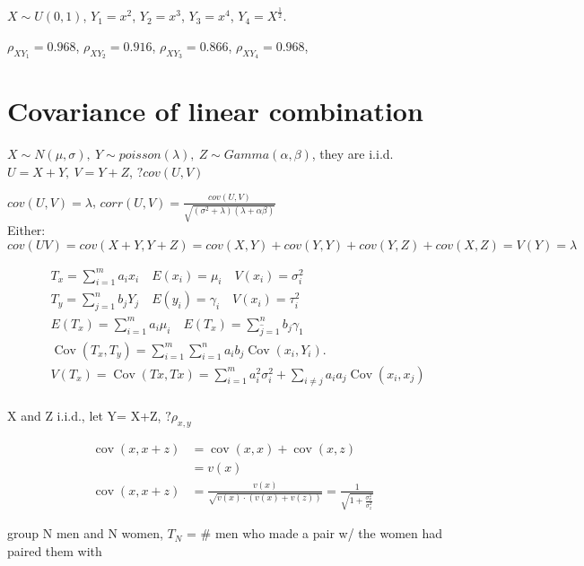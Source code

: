\documentclass{article}
\begin{document}
\begin{example}
    $X\sim U( 0,1 ) $, $Y_{1}=x^{2} $, $Y_{2}=x^{3} $, $Y_{3}=x^{4} $, $Y_{4}=X^{\frac{1}{2}} $. 
\end{example}
$\rho_{XY_{1}}=0.968 $, $\rho_{XY_{2}}=0.916 $, $\rho_{XY_{3}}=0.866 $, $\rho_{XY_{4}}=0.968 $,


\section{Covariance of linear combination}

\begin{example}
    $X \sim N( \mu,\sigma ),\ Y\sim poisson(\lambda),\ Z\sim Gamma( \alpha,\beta ) $, they are i.i.d. $U=X+Y,\ V=Y+Z $, 
    $?cov(U,V) $
\end{example}
$cov( U,V)=\lambda $,  $corr( U, V )=\frac{cov(U,V)}{\sqrt{( \sigma^{2}+\lambda )( \lambda+\alpha \beta )}  } $
\\
Either: $cov(UV)=cov(X+Y,Y+Z)=cov(X,Y)+cov(Y,Y)+ cov(Y,Z)+cov(X,Z)=V( Y )=\lambda  $
\begin{theorem}
    \begin{align*}
        & T_x=\sum_{i=1}^m a_i x_i \quad E\left(x_i\right)=\mu_i \quad V\left(x_i\right)={\sigma}_i^2 \\
        & T_y=\sum_{j=1}^n b_j Y_j \quad E\left(y_i\right)=\gamma_i \quad V\left(x_i\right)={\tau}_i^2\\
        & E\left(T_x\right)=\sum_{i=1}^m a_i \mu_i  \quad
        E\left(T_x\right)=\sum_{\hat{j}=1}^n b_j \gamma_1 \\
        & \operatorname{Cov}\left(T_x, T_y\right)=\sum_{i=1}^m \sum_{i=1}^n a_i b_j \operatorname{Cov}\left(x_i, Y_i\right) . \\
        & V\left(T_x\right)=\operatorname{Cov}(T x, T x)=\sum_{i=1}^m a_i^2 \sigma_i^2+\sum_{i \neq j} a_i a_j \operatorname{Cov}\left(x_i, x_j\right) \\
        &
    \end{align*}
\end{theorem}
\begin{example}
    X and Z i.i.d., let Y= X+Z, $?\rho_{x,y} $
\end{example}

\begin{align*}
    \operatorname{cov}(x, x+z) & =\operatorname{cov}(x, x)+\operatorname{cov}(x, z) \\
& =v(x) \\
\operatorname{cov}(x, x+z) & =\frac{v(x)}{\sqrt{v(x) \cdot(v(x)+v(z))}}=\frac{1}{\sqrt{1+\frac{\sigma_x^2}{\sigma_z^2}}}
\end{align*}
\begin{example}
    group N men and N women, $T_{N} $ = \# men who made a pair w/ the women had paired them with 
\end{example}
\end{document}
